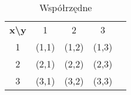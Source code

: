 \begin{table}[htbp]
    \centering
\begin{tabular}{|c|c|c|c|l}
\cline{1-4}
\textbf{x\textbackslash{}y} & 1     & 2     & 3     &  \\ \cline{1-4}
1                           & (1,1) & (1,2) & (1,3) &  \\ \cline{1-4}
2                           & (2,1) & (2,2) & (2,3) &  \\ \cline{1-4}
3                           & (3,1) & (3,2) & (3,3) &  \\ \cline{1-4}
\end{tabular}
\caption{Współrzędne}
\label{tab:patr}
\end{table}